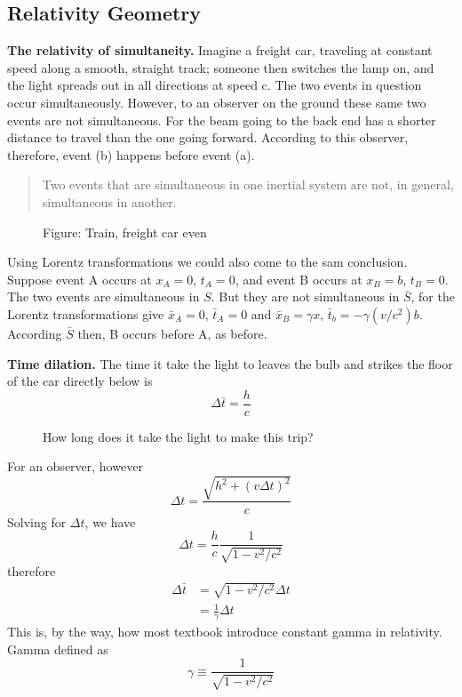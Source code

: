 \documentclass[../../main.tex]{subfiles}
\begin{document}
\subsection{Relativity Geometry}
\textbf{The relativity of simultaneity.} Imagine a freight car, traveling at constant speed along a smooth, straight track; someone then switches the lamp on, and the light spreads out in all directions at speed c. The two events in question occur simultaneously. However, to an observer on the ground these same two events are not simultaneous. For the beam going to the back end has a shorter distance to travel than the one going forward. According to this observer, therefore, event (b) happens before event (a). 
\begin{quote}
    Two events that are simultaneous in one inertial system are not, in general, simultaneous in another.
\end{quote}
\begin{figure}[b]
    \centering
    \caption*{Figure: Train, freight car even}
\end{figure}
Using Lorentz transformations we could also come to the sam conclusion. Suppose event A occurs at $x_A = 0$, $t_A = 0$, and event B occurs at $x_B = b$, $t_B = 0$. The two events are simultaneous in $S$. But they are not simultaneous in $\bar{S}$, for the Lorentz transformations give $\bar{x}_A = 0$, $\bar{t}_A = 0$ and $\bar{x}_B = \gamma x$, $\bar{t}_b = -\gamma(v/c^2)b$. According $\bar{S}$ then, B occurs before A, as before.

\textbf{Time dilation.} The time it take the light to leaves the bulb and strikes the floor of the car directly below is
\begin{equation*}
    \Delta \bar{t}=\frac{h}{c}
\end{equation*}
\begin{figure}
    \centering
    \caption*{How long does it take the light to make this trip?}
\end{figure}
For an observer, however
\begin{equation*}
    \Delta t=\frac{\sqrt{h^2+(v\Delta t)^2}}{c}
\end{equation*}
Solving for $\Delta t$, we have
\begin{equation*}
    \Delta t=\frac{h}{c}\frac{1}{\sqrt{1-v^2/c^2}}
\end{equation*}
therefore
\begin{align*}
    \Delta \bar{t}&=\sqrt{1-v^2/c^2} \Delta t\\
    &=\frac{1}{\gamma} \Delta t
\end{align*}
This is, by the way, how most textbook introduce constant gamma in relativity. Gamma defined as 
\begin{equation*}
    \gamma\equiv\frac{1}{\sqrt{1-v^2/c^2}}
\end{equation*}
\end{document}

